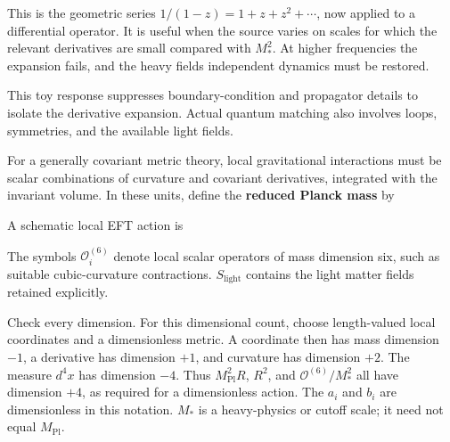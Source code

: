 \documentclass[
  11pt,
  letterpaper,
  oneside,
  openany]{scrbook}
\begin{document}
This is the geometric series \(1/(1-z)=1+z+z^2+\cdots\), now applied to
a differential operator. It is useful when the source varies on scales
for which the relevant derivatives are small compared with \(M_*^2\). At
higher frequencies the expansion fails, and the heavy
field\textquotesingle s independent dynamics must be restored.

This toy response suppresses boundary-condition and propagator details
to isolate the derivative expansion. Actual quantum matching also
involves loops, symmetries, and the available light fields.

For a generally covariant metric theory, local gravitational
interactions must be scalar combinations of curvature and covariant
derivatives, integrated with the invariant volume. In these units,
define the \textbf{reduced Planck mass} by

\begin{center}
\begingroup
{}
\ifdim\wd\grmathbox>\linewidth
\resizebox{\linewidth}{!}{\usebox{\grmathbox}}
\else\usebox{\grmathbox}\fi
\endgroup
\end{center}

A schematic local EFT action is

\begin{center}
\begingroup
{}
\ifdim\wd\grmathbox>\linewidth
\resizebox{\linewidth}{!}{\usebox{\grmathbox}}
\else\usebox{\grmathbox}\fi
\endgroup
\end{center}

The symbols \(\mathcal O_i^{(6)}\) denote local scalar operators of mass
dimension six, such as suitable cubic-curvature contractions.
\(S_{\mathrm{light}}\) contains the light matter fields retained
explicitly.

Check every dimension. For this dimensional count, choose length-valued
local coordinates and a dimensionless metric. A coordinate then has mass
dimension \(-1\), a derivative has dimension \(+1\), and curvature has
dimension \(+2\). The measure \(d^4x\) has dimension \(-4\). Thus
\(M_{\mathrm{Pl}}^2R\), \(R^2\), and \(\mathcal O^{(6)}/M_*^2\) all have
dimension \(+4\), as required for a dimensionless action. The \(a_i\)
and \(b_i\) are dimensionless in this notation. \(M_*\) is a
heavy-physics or cutoff scale; it need not equal \(M_{\mathrm{Pl}}\).
\end{document}
